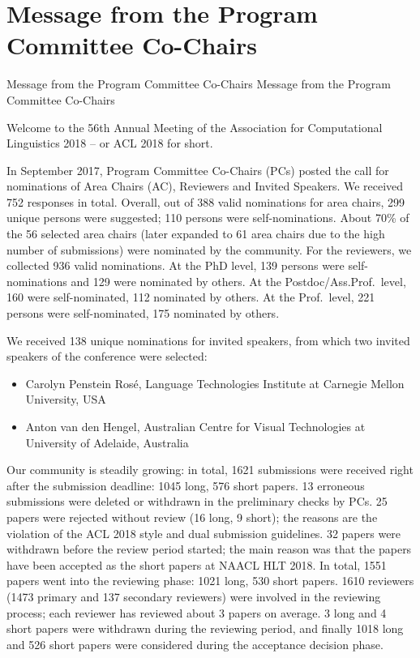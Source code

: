 \section{Message from the Program Committee Co-Chairs}\vspace{2em}
\setheaders%
    {Message from the Program Committee Co-Chairs}%
    {Message from the Program Committee Co-Chairs}
\thispagestyle{emptyheader}

\setlength{\parskip}{.7ex}


Welcome to the 56th Annual Meeting of the Association for Computational Linguistics 2018 -- or ACL 2018 for short. 

In September 2017, Program Committee Co-Chairs (PCs) posted the call for nominations of Area Chairs (AC), Reviewers and Invited Speakers. We received 752 responses in total. Overall, out of 388 valid nominations for area chairs, 299 unique persons were suggested; 110 persons were self-nominations. About 70\% of the 56 selected area chairs (later expanded to 61 area chairs due to the high number of submissions) were nominated by the community. For the reviewers, we collected 936 valid nominations. At the PhD level, 139 persons were self-nominations and 129 were nominated by others. At the Postdoc/Ass.Prof.~level, 160 were self-nominated, 112 nominated by others. At the Prof.~level, 221 persons were self-nominated, 175 nominated by others. 

We received 138 unique nominations for invited speakers, from which two invited speakers of the conference were selected: 
\begin{itemize}
	\item Carolyn Penstein Rosé, Language Technologies Institute at Carnegie Mellon University, USA
	\item Anton van den Hengel, Australian Centre for Visual Technologies at University of Adelaide, Australia
\end{itemize}


Our community is steadily growing: in total, 1621 submissions were received right after the submission deadline: 1045 long, 576 short papers. 13 erroneous submissions were deleted or withdrawn in the preliminary checks by PCs. 25 papers were rejected without review (16 long, 9 short); the reasons are the violation of the ACL 2018 style and dual submission guidelines. 32 papers were withdrawn before the review period started; the main reason was that the papers have been accepted as the short papers at NAACL HLT 2018. In total, 1551 papers went into the reviewing phase: 1021 long, 530 short papers. 1610 reviewers (1473 primary and 137 secondary reviewers) were involved in the reviewing process; each reviewer has reviewed about 3 papers on average.  3 long and 4 short papers were withdrawn during the reviewing period, and finally 1018 long and 526 short papers were considered during the acceptance decision phase.

